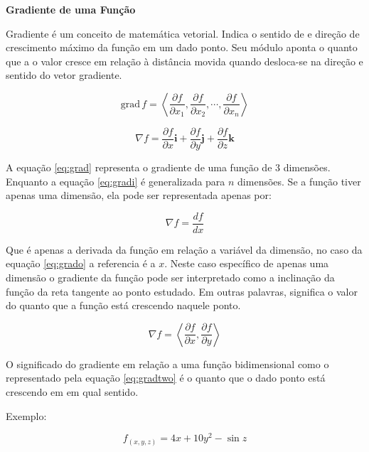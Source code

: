\documentclass[a4paper]{sbgames}               %
\begin{document}
\textbf{Gradiente de uma Função}

Gradiente é um conceito de matemática vetorial. Indica o sentido de e direção de crescimento máximo da função em um dado ponto. Seu módulo aponta o quanto que a o valor cresce em relação à distância movida quando desloca-se na direção e sentido do vetor gradiente.

\begin{equation}
\mbox{grad} \, f = \left\langle \frac{\partial f}{\partial x_1}, \frac{\partial f}{\partial x_2}, \cdots, \frac{\partial f}{\partial x_n} \right\rangle
\label{eq:gradi}
\end{equation}

\begin{equation}
\nabla f = \frac{\partial f}{\partial x} \mathbf{i} + \frac{\partial f}{\partial y} \mathbf{j} + \frac{\partial f}{\partial z} \mathbf{k}
\label{eq:grad}
\end{equation}


A equação \ref{eq:grad} representa o gradiente de uma função de $3$ dimensões. Enquanto a equação \ref{eq:gradi} é generalizada para $n$ dimensões. Se a função tiver apenas uma dimensão, ela pode ser representada apenas por:

\begin{equation}
\nabla f = \frac{df}{dx}
\label{eq:grado}
\end{equation}

Que é apenas a derivada da função em relação a variável da dimensão, no caso da equação \ref{eq:grado} a referencia é a $x$. Neste caso específico de apenas uma dimensão o gradiente da função pode ser interpretado como a inclinação da função da reta tangente ao ponto estudado. Em outras palavras, significa o valor do quanto que a função está crescendo naquele ponto.

\begin{equation}
\nabla f = \left\langle \frac{\partial f}{\partial x}, \frac{\partial f}{\partial y} \right\rangle
\label{eq:gradtwo}
\end{equation}

O significado do gradiente em relação a uma função bidimensional como o representado pela equação \ref{eq:gradtwo} é o quanto que o dado ponto está crescendo em em qual sentido.

Exemplo:

\begin{equation}
f_{\!\left( x, y, z \right)} = 4x + 10y^2 - \sin z
\label{eq:exone}
\end{equation}
\end{document}
